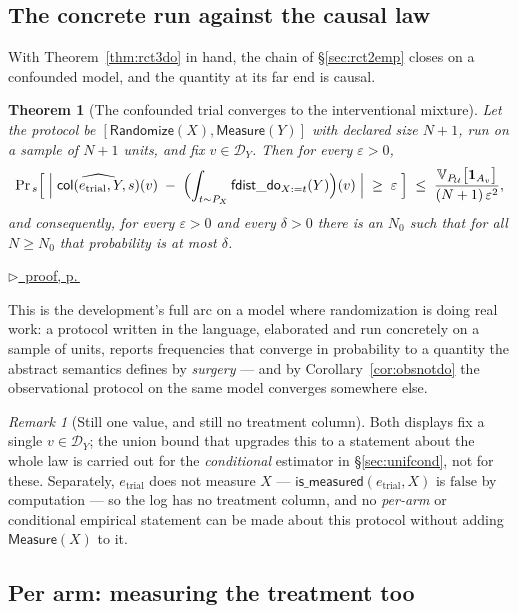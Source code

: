 \documentclass[11pt,a4paper]{article}
\theoremstyle{definition}
\theoremstyle{plain}
\newtheorem{theorem}[definition]{Theorem}
\theoremstyle{remark}
\newtheorem{remark}[definition]{Remark}
\newcommand{\dom}{\mathcal{D}}
\newcommand{\Ctx}{\mathcal{U}}         %
\newcommand{\fdo}{\mathsf{fdist\_do}}
\newcommand{\emp}[1]{\widehat{#1}}
\newcommand{\Ind}[1]{\mathbf{1}_{#1}}
\newcommand{\Var}{\mathbb{V}}
\renewcommand{\Pr}{\mathrm{Pr}}
\newcommand{\pfref}[1]{%
  \par\smallskip\noindent
  \hyperref[pf:#1]{\small$\triangleright$\ proof, p.\,\pageref{pf:#1}}\par\smallskip}
\begin{document}
\subsection{The concrete run against the causal law}
\label{sec:rct3emp}

With Theorem~\ref{thm:rct3do} in hand, the chain of \S\ref{sec:rct2emp}
closes on a confounded model, and the quantity at its far end is causal.

\begin{theorem}[The confounded trial converges to the interventional mixture]
\label{thm:rct3emp}
Let the protocol be $[\mathsf{Randomize}(X), \mathsf{Measure}(Y)]$ with
declared size $N+1$, run on a sample of $N+1$ units, and fix
$v \in \dom_Y$. Then for every $\varepsilon > 0$,
\[
  \Pr_{\,s}
  \Bigl[\;
     \Bigl|\;\emp{\mathsf{col}(e_{\mathrm{trial}},Y,s)}(v)
       \;-\; \Bigl(\int_{t \sim P_X} \fdo_{X := t}(Y)\Bigr)(v)
     \;\Bigr| \;\ge\; \varepsilon
  \;\Bigr]
  \;\le\;
  \frac{\Var_{P_\Ctx}\bigl[\Ind{A_v}\bigr]}{(N+1)\,\varepsilon^{2}} ,
\]
and consequently, for every $\varepsilon > 0$ and every $\delta > 0$ there
is an $N_0$ such that for all $N \ge N_0$ that probability is at most
$\delta$.
\end{theorem}

\pfref{thm:rct3emp}

This is the development's full arc on a model where randomization is doing
real work: a protocol written in the language, elaborated and run
concretely on a sample of units, reports frequencies that converge in
probability to a quantity the abstract semantics defines by \emph{surgery}
--- and by Corollary~\ref{cor:obsnotdo} the observational protocol on the
same model converges somewhere else.

\begin{remark}[Still one value, and still no treatment column]
\label{rem:rct3emplimits}
Both displays fix a single $v \in \dom_Y$; the union bound that upgrades
this to a statement about the whole law is carried out for the
\emph{conditional} estimator in \S\ref{sec:unifcond}, not for these.
Separately, $e_{\mathrm{trial}}$ does not measure $X$ ---
$\mathsf{is\_measured}(e_{\mathrm{trial}}, X)$ is $\mathrm{false}$ by
computation --- so the log has no treatment column, and no \emph{per-arm}
or conditional empirical statement can be made about this protocol without
adding $\mathsf{Measure}(X)$ to it.
\end{remark}

\subsection{Per arm: measuring the treatment too}
\label{sec:rct3arm}
\end{document}
